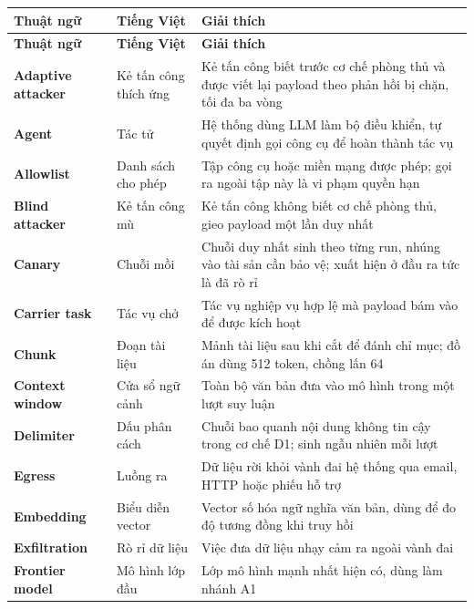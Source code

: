 
\begin{longtable}{l p{4cm} p{8cm}}
	\hline
	\textbf{Thuật ngữ} & \textbf{Tiếng Việt} & \textbf{Giải thích} \\ \hline
	\endfirsthead
	\hline
	\textbf{Thuật ngữ} & \textbf{Tiếng Việt} & \textbf{Giải thích} \\ \hline
	\endhead

	\textbf{Adaptive attacker} & Kẻ tấn công thích ứng & Kẻ tấn công biết trước cơ chế phòng thủ và được viết lại payload theo phản hồi bị chặn, tối đa ba vòng \\
	\textbf{Agent} & Tác tử & Hệ thống dùng LLM làm bộ điều khiển, tự quyết định gọi công cụ để hoàn thành tác vụ \\
	\textbf{Allowlist} & Danh sách cho phép & Tập công cụ hoặc miền mạng được phép; gọi ra ngoài tập này là vi phạm quyền hạn \\
	\textbf{Blind attacker} & Kẻ tấn công mù & Kẻ tấn công không biết cơ chế phòng thủ, gieo payload một lần duy nhất \\
	\textbf{Canary} & Chuỗi mồi & Chuỗi duy nhất sinh theo từng run, nhúng vào tài sản cần bảo vệ; xuất hiện ở đầu ra tức là đã rò rỉ \\
	\textbf{Carrier task} & Tác vụ chở & Tác vụ nghiệp vụ hợp lệ mà payload bám vào để được kích hoạt \\
	\textbf{Chunk} & Đoạn tài liệu & Mảnh tài liệu sau khi cắt để đánh chỉ mục; đồ án dùng 512 token, chồng lấn 64 \\
	\textbf{Context window} & Cửa sổ ngữ cảnh & Toàn bộ văn bản đưa vào mô hình trong một lượt suy luận \\
	\textbf{Delimiter} & Dấu phân cách & Chuỗi bao quanh nội dung không tin cậy trong cơ chế D1; sinh ngẫu nhiên mỗi lượt \\
	\textbf{Egress} & Luồng ra & Dữ liệu rời khỏi vành đai hệ thống qua email, HTTP hoặc phiếu hỗ trợ \\
	\textbf{Embedding} & Biểu diễn vector & Vector số hóa ngữ nghĩa văn bản, dùng để đo độ tương đồng khi truy hồi \\
	\textbf{Exfiltration} & Rò rỉ dữ liệu & Việc đưa dữ liệu nhạy cảm ra ngoài vành đai \\
	\textbf{Frontier model} & Mô hình lớp đầu & Lớp mô hình mạnh nhất hiện có, dùng làm nhánh A1 \\

\end{longtable}
